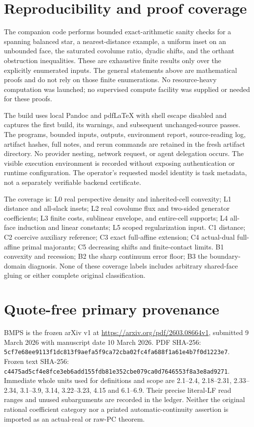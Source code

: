 \documentclass[
  11pt,
]{article}
\begin{document}
\section{Reproducibility and proof
coverage}\label{reproducibility-and-proof-coverage}

The companion code performs bounded exact-arithmetic sanity checks for a
spanning balanced star, a nearest-distance example, a uniform inset on
an unbounded face, the saturated covolume ratio, dyadic shifts, and the
orthant obstruction inequalities. These are exhaustive finite results
only over the explicitly enumerated inputs. The general statements above
are mathematical proofs and do not rely on those finite enumerations. No
resource-heavy computation was launched; no supervised compute facility
was supplied or needed for these proofs.

The build uses local Pandoc and pdfLaTeX with shell escape disabled and
captures the first build, its warnings, and subsequent unchanged-source
passes. The programs, bounded inputs, outputs, environment report,
source-reading log, artifact hashes, full notes, and rerun commands are
retained in the fresh artifact directory. No provider nesting, network
request, or agent delegation occurs. The visible execution environment
is recorded without exposing authentication or runtime configuration.
The operator's requested model identity is task metadata, not a
separately verifiable backend certificate.

The coverage is: L0 real perspective density and inherited-cell
convexity; L1 distance and all-slack insets; L2 real covolume flux and
two-sided generator coefficients; L3 finite costs, sublinear envelope,
and entire-cell supports; L4 all-face induction and linear constants; L5
scoped regularization input. C1 distance; C2 coercive auxiliary
reference; C3 exact full-affine extension; C4 actual-dual full-affine
primal majorants; C5 decreasing shifts and finite-contact limits. B1
convexity and recession; B2 the sharp continuum error floor; B3 the
boundary-domain diagnosis. None of these coverage labels includes
arbitrary shared-face gluing or either complete original classification.

\section{Quote-free primary
provenance}\label{quote-free-primary-provenance}

BMPS is the frozen arXiv v1 at \url{https://arxiv.org/pdf/2603.08664v1},
submitted 9 March 2026 with manuscript date 10 March 2026. PDF SHA-256:
\texttt{5cf7e68ee9113f1dc813f9aefa5f9ca72cba02fc4fa688f1a61e4b7f0d1223e7}.
Frozen text SHA-256:
\texttt{c4475ad5cf4e8fce3eb6add155fdb81e352cbe079ca0d7646553f8a3e8ad9271}.
Immediate whole units used for definitions and scope are 2.1--2.4,
2.18--2.31, 2.33--2.34, 3.1--3.9, 3.14, 3.22--3.23, 4.15 and 6.1--6.9.
Their precise literal-LF read ranges and unused subarguments are
recorded in the ledger. Neither the original rational coefficient
category nor a printed automatic-continuity assertion is imported as an
actual-real or raw-PC theorem.
\end{document}
